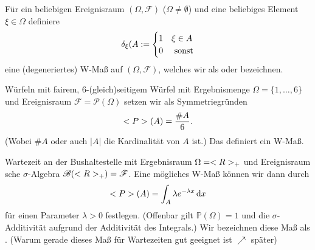 \begin{example}
	Für ein beliebigen Ereignisraum $(\Omega, \mathscr{F})$ ($\Omega \neq \emptyset$) und eine beliebiges Element $\xi \in \Omega$ definiere
	\begin{align}
		\delta_{\xi}(A := \begin{cases}
		1 & \xi \in A \\
		0 & \text{ sonst}
		\end{cases}\notag
	\end{align}
	eine (degeneriertes) W-Maß auf $(\Omega, \mathscr{F})$, welches wir als  oder  bezeichnen.
\end{example}

\begin{example}
	Würfeln mit fairem, $6$-(gleich)seitigem Würfel mit Ergebnismenge $\Omega=\{1, \dots, 6\}$ und Ereignisraum $\mathscr{F} = \mathscr{P}(\Omega)$ setzen wir als Symmetriegründen
	\begin{align}
		\mathbb{P}(A) = \frac{\# A}{6}.\notag
	\end{align}
	(Wobei $\# A$ oder auch $\vert A \vert$ die Kardinalität von $A$ ist.) Das definiert ein W-Maß.
\end{example}

\begin{example}
	Wartezeit an der Bushaltestelle mit Ergebnisraum $\Omega = \real_{+}$ und Ereignisraum sche $\sigma$-Algebra $\mathscr{B}(\real_{+}) = \mathscr{F}$. Eine mögliches W-Maß können wir dann durch
	\begin{align}
	\mathbb{P}(A) = \int_{A} \lambda e^{-\lambda x} \diff x\notag %
	\end{align}
	für einen Parameter $\lambda > 0$ festlegen. (Offenbar gilt $\mathbb{P}(\Omega) = 1$ und die $\sigma$-Additivität aufgrund der Additivität des Integrals.) Wir bezeichnen diese Maß als . (Warum gerade dieses Maß für Wartezeiten gut geeignet ist $\nearrow$ später) %
\end{example}


